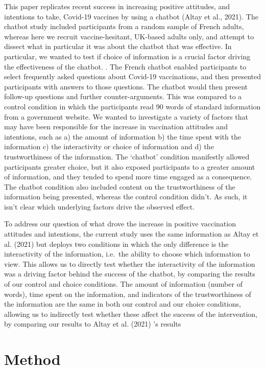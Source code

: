 \documentclass[
  english,
  ,jou,floatsintext]{apa6}
\begin{document}
This paper replicates recent success in increasing positive attitudes, and intentions to take, Covid-19 vaccines by using a chatbot (Altay et al., 2021). The chatbot study included participants from a random sample of French adults, whereas here we recruit vaccine-hesitant, UK-based adults only, and attempt to dissect what in particular it was about the chatbot that was effective. In particular, we wanted to test if choice of information is a crucial factor driving the effectiveness of the chatbot. . The French chatbot enabled participants to select frequently asked questions about Covid-19 vaccinations, and then presented participants with answers to those questions. The chatbot would then present follow-up questions and further counter-arguments. This was compared to a control condition in which the participants read 90 words of standard information from a government website. We wanted to investigate a variety of factors that may have been responsible for the increase in vaccination attitudes and intentions, such as a) the amount of information b) the time spent with the information c) the interactivity or choice of information and d) the trustworthiness of the information. The `chatbot' condition manifestly allowed participants greater choice, but it also exposed participants to a greater amount of information, and they tended to spend more time engaged as a consequence. The chatbot condition also included content on the trustworthiness of the information being presented, whereas the control condition didn't. As such, it isn't clear which underlying factors drive the observed effect.

To address our question of what drove the increase in positive vaccination attitudes and intentions, the current study uses the same information as Altay et al. (2021) but deploys two conditions in which the only difference is the interactivity of the information, i.e.~the ability to choose which information to view. This allows us to directly test whether the interactivity of the information was a driving factor behind the success of the chatbot, by comparing the results of our control and choice conditions. The amount of information (number of words), time spent on the information, and indicators of the trustworthiness of the information are the same in both our control and our choice conditions, allowing us to indirectly test whether these affect the success of the intervention, by comparing our results to Altay et al. (2021) 's results

\hypertarget{method}{%
\section{Method}\label{method}}
\end{document}
